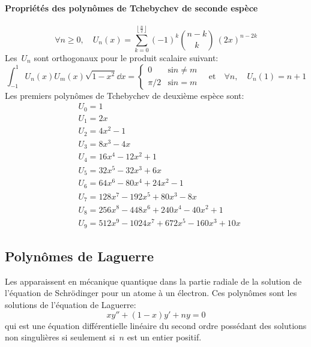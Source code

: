 \paragraph{Propriétés des polynômes de Tchebychev de seconde espèce} 
\begin{equation}
\forall n\ge 0, \quad U_n(x)=\sum_{k=0}^{\left\lfloor \frac n2\right \rfloor}(-1)^k \binom{n-k}k~(2x)^{n-2k} 
\end{equation}
Les~$U_n$ sont orthogonaux pour le produit scalaire suivant: 
\begin{equation}
\int_{-1}^1 U_n(x)U_m(x)\sqrt{1-x^2}\dd x = 
\begin{cases} 0&\text{si}n\ne m\\ \pi/2 &\text{si}n=m 
\end{cases} 
\quad\text{et}\quad\forall n,\quad U_n(1)=n+1 
\end{equation}
Les premiers polynômes de Tchebychev de deuxième espèce sont:
\begin{equation}
\begin{aligned}
&U_0 = 1 \\
&U_1 = 2x \\
&U_2 = 4x^2 - 1 \\
&U_3 = 8x^3 - 4x \\
&U_4 = 16x^4 - 12x^2 + 1 \\
&U_5 = 32x^5 - 32x^3 + 6x \\
&U_6 = 64x^6 - 80x^4 + 24x^2 - 1 \\
&U_7 = 128x^7 - 192x^5 + 80x^3 - 8x \\
&U_8 = 256x^8 - 448 x^6 + 240 x^4 - 40 x^2 + 1 \\
&U_9 = 512x^9 - 1024 x^7 + 672 x^5 - 160 x^3 + 10 x
\end{aligned}
\end{equation}
\subsection{Polynômes de Laguerre} 
Les  apparaissent en mécanique quantique dans la partie radiale de la solution de l'équation de Schrödinger pour un atome à un électron. Ces polynômes sont les solutions de l'équation de Laguerre: 
\begin{equation}
 xy'' + (1 - x)y' + ny = 0 
\end{equation}
qui est une équation différentielle linéaire du second ordre possédant des solutions non singulières si seulement si~$n$ est un entier positif. 

